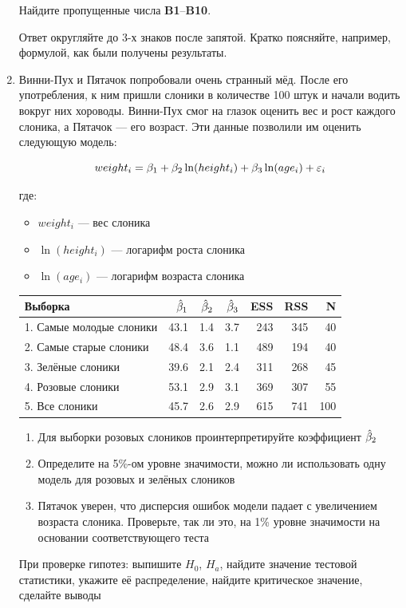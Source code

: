 \documentclass[12pt, a4paper]{article}\usepackage[]{graphicx}\usepackage[]{color}
\begin{document}
\begin{enumerate}
Найдите пропущенные числа \textbf{B1}--\textbf{B10}.

Ответ округляйте до 3-х знаков после запятой. Кратко поясняйте, например, формулой, как были получены результаты.

\item Винни-Пух и Пятачок попробовали очень странный мёд. После его употребления, к ним пришли слоники в количестве 100 штук и начали водить вокруг них хороводы. Винни-Пух смог на глазок оценить вес и рост каждого слоника, а Пятачок — его возраст. Эти данные позволили им оценить следующую модель:

\[
weight_i = \beta_1 + \beta_2 \ln(height_i) + \beta_3 \ln(age_i) + \varepsilon_i
\]

где:
\begin{itemize}
\item $weight_i$ — вес слоника
\item $\ln(height_i)$ — логарифм роста слоника
\item $\ln(age_i)$ — логарифм возраста слоника
\end{itemize}


\begin{tabular}{lrrrrrr} \toprule
Выборка & $\hat{\beta}_1$ & $\hat{\beta}_2$ & $\hat{\beta}_3$ & ESS & RSS & N  \\
\midrule
1. Самые молодые слоники  & 43.1 & 1.4 & 3.7 & 243 & 345 & 40\\
2. Самые старые слоники & 48.4 & 3.6 & 1.1 & 489 & 194 & 40 \\
3. Зелёные слоники & 39.6 & 2.1 & 2.4 & 311 & 268 & 45 \\
4. Розовые слоники & 53.1 & 2.9 & 3.1 & 369 & 307 & 55 \\
5. Все слоники & 45.7 & 2.6 & 2.9 & 615 & 741 & 100 \\
\bottomrule
\end{tabular}


\begin{enumerate}
\item Для выборки розовых слоников проинтерпретируйте коэффициент $\hat{\beta}_2$
\item Определите на 5\%-ом уровне значимости, можно ли использовать одну модель для розовых и зелёных слоников
\item Пятачок уверен, что дисперсия ошибок модели падает с увеличением возраста слоника. Проверьте, так ли это, на 1\% уровне значимости на основании соответствующего теста
\end{enumerate}

При проверке гипотез: выпишите $H_0$, $H_a$, найдите значение тестовой статистики, укажите её распределение, найдите критическое значение, сделайте выводы


\end{enumerate}
\end{document}
